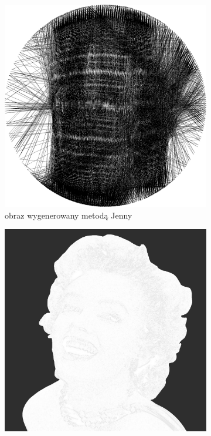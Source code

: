 \begin{figure}[H]
\begin{subfigure}{0.40\textwidth}
        \includegraphics[width = \textwidth]{img/6-comp/monroe-portrait_jenny_1561W-1P-300N-2000.png}
        \caption{obraz wygenerowany metodą Jenny}
        \label{comp-comp-monroe-b}
    \end{subfigure}
    \begin{subfigure}{0.40\textwidth}
        \centering
        \includegraphics[width = \textwidth]{img/6-comp/monroe-portrait_mask_c20_inv0_bg10_obj1_ed1.png}

\end{subfigure}
\end{figure}
